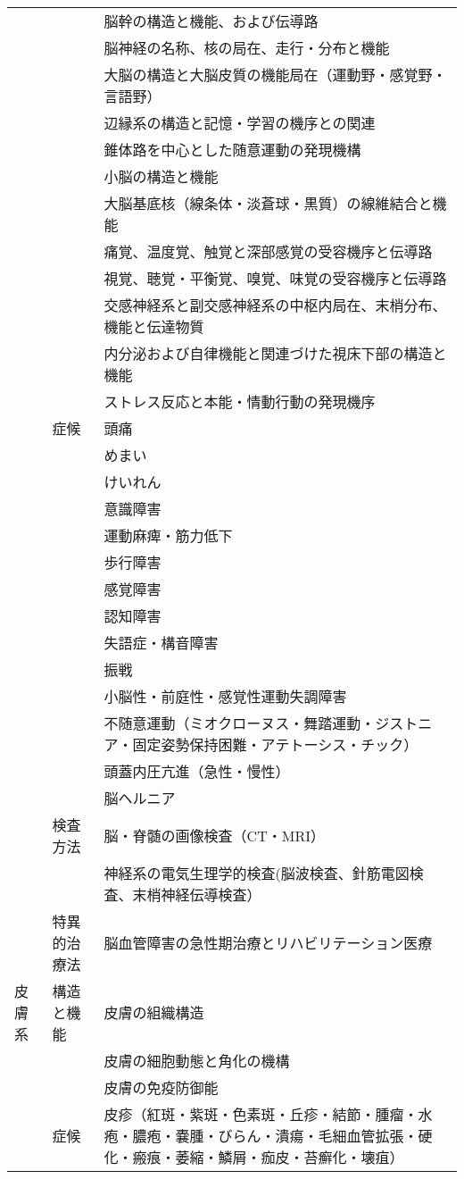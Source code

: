 \begin{xltabular}{\linewidth}{XXX}
 &  & 脳幹の構造と機能、および伝導路 \\
 &  & 脳神経の名称、核の局在、走行・分布と機能 \\
 &  & 大脳の構造と大脳皮質の機能局在（運動野・感覚野・言語野） \\
 &  & 辺縁系の構造と記憶・学習の機序との関連 \\
 &  & 錐体路を中心とした随意運動の発現機構 \\
 &  & 小脳の構造と機能 \\
 &  & 大脳基底核（線条体・淡蒼球・黒質）の線維結合と機能 \\
 &  & 痛覚、温度覚、触覚と深部感覚の受容機序と伝導路 \\
 &  & 視覚、聴覚・平衡覚、嗅覚、味覚の受容機序と伝導路 \\
 &  & 交感神経系と副交感神経系の中枢内局在、末梢分布、機能と伝達物質 \\
 &  & 内分泌および自律機能と関連づけた視床下部の構造と機能 \\
 &  & ストレス反応と本能・情動行動の発現機序 \\
 & 症候 & 頭痛 \\
 &  & めまい \\
 &  & けいれん \\
 &  & 意識障害 \\
 &  & 運動麻痺・筋力低下 \\
 &  & 歩行障害 \\
 &  & 感覚障害 \\
 &  & 認知障害 \\
 &  & 失語症・構音障害 \\
 &  & 振戦 \\
 &  & 小脳性・前庭性・感覚性運動失調障害 \\
 &  & 不随意運動（ミオクローヌス・舞踏運動・ジストニア・固定姿勢保持困難・アテトーシス・チック） \\
 &  & 頭蓋内圧亢進（急性・慢性） \\
 &  & 脳ヘルニア \\
 & 検査方法 & 脳・脊髄の画像検査（CT・MRI） \\
 &  & 神経系の電気生理学的検査(脳波検査、針筋電図検査、末梢神経伝導検査） \\
 & 特異的治療法 & 脳血管障害の急性期治療とリハビリテーション医療 \\
皮膚系 & 構造と機能 & 皮膚の組織構造 \\
 &  & 皮膚の細胞動態と角化の機構 \\
 &  & 皮膚の免疫防御能 \\
 & 症候 & 皮疹（紅斑・紫斑・色素斑・丘疹・結節・腫瘤・水疱・膿疱・嚢腫・びらん・潰瘍・毛細血管拡張・硬化・瘢痕・萎縮・鱗屑・痂皮・苔癬化・壊疽） \\

\end{xltabular}
